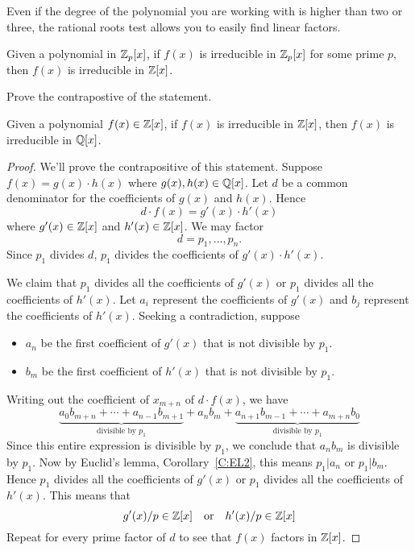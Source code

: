 \documentclass{ximera}
\begin{document}
Even if the degree of the polynomial you are working with is higher
than two or three, the rational roots test allows you to easily find
linear factors.


\begin{lemma}\label{L:RCP}
  Given a polynomial in $\mathbb Z_p[x]$, if $f(x)$ is irreducible in
  $\mathbb Z_p[x]$ for some prime $p$, then $f(x)$ is irreducible in $\mathbb Z[x]$.
  \begin{sketch}
    Prove the contrapostive of the statement.
  \end{sketch}
\end{lemma}


\begin{lemma}\label{L:G}
  Given a polynomial $f(x)\in\mathbb Z[x]$, if $f(x)$ is irreducible in
  $\mathbb Z[x]$, then $f(x)$ is irreducible in $\mathbb Q[x]$.
  \begin{proof}
    We'll prove the contrapositive of this statement. Suppose $f(x) =
    g(x)\cdot h(x)$ where $g(x),h(x)\in\mathbb Q[x]$. Let $d$ be a common
    denominator for the coefficients of $g(x)$ and $h(x)$. Hence
    \[
    d\cdot f(x) = g'(x)\cdot h'(x)
    \]
    where $g'(x)\in \mathbb Z[x]$ and $h'(x) \in\mathbb Z[x]$. We may factor
    \[
    d = p_1,\dots, p_n.
    \]
    Since $p_1$ divides $d$, $p_1$ divides the coefficients of
    $g'(x)\cdot h'(x)$.


    We claim that $p_1$ divides all the coefficients of $g'(x)$ or
    $p_1$ divides all the coefficients of $h'(x)$.  Let $a_i$
    represent the coefficients of $g'(x)$ and $b_j$ represent the
    coefficients of $h'(x)$. Seeking a contradiction, suppose 
    \begin{itemize}
      \item $a_n$ be the first coefficient of $g'(x)$ that is not
        divisible by $p_1$.
      \item $b_m$ be the first coefficient of $h'(x)$ that is not
        divisible by $p_1$.
    \end{itemize}
    Writing out the coefficient of $x_{m+n}$ of $d\cdot f(x)$, we have
    \[
    \underbrace{a_0b_{m+n}  + \cdots + a_{n-1}b_{m+1}}_{\text{divisible by $p_1$}} + a_nb_m + \underbrace{a_{n+1}b_{m-1} + \cdots + a_{m+n} b_0}_{\text{divisible by $p_1$}}
    \]
    Since this entire expression is divisible by $p_1$, we conclude
    that $a_nb_m$ is divisible by $p_1$. Now by Euclid's lemma,
    Corollary~\ref{C:EL2}, this means $p_1|a_n$ or $p_1|b_m$. Hence $p_1$
    divides all the coefficients of $g'(x)$ or $p_1$ divides all the
    coefficients of $h'(x)$. This means that
    \[
    g'(x)/p \in \mathbb Z[x] \quad\text{or}\quad h'(x)/p \in \mathbb Z[x]
    \]
    Repeat for every prime factor of $d$ to see that $f(x)$ factors in
    $\mathbb Z[x]$.
  \end{proof}
\end{lemma}
\end{document}
